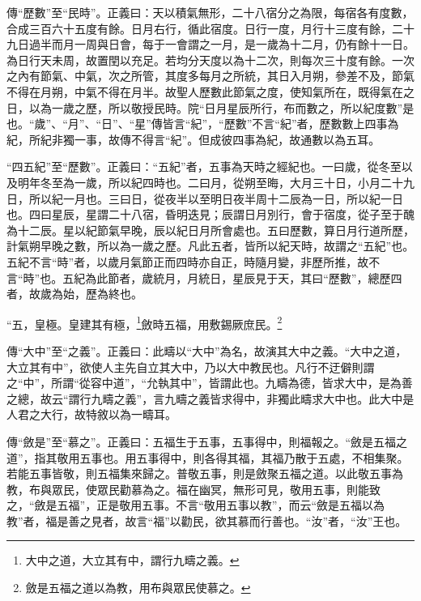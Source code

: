 {\noindent\zhuan{}\fzbyks 傳“歷數”至“民時”。正義曰：天以積氣無形，二十八宿分之為限，每宿各有度數，合成三百六十五度有餘。日月右行，循此宿度。日行一度，月行十三度有餘，二十九日過半而月一周與日會，每于一會謂之一月，是一歲為十二月，仍有餘十一日。為日行天未周，故置閏以充足。若均分天度以為十二次，則每次三十度有餘。一次之內有節氣、中氣，次之所管，其度多每月之所統，其日入月朔，參差不及，節氣不得在月朔，中氣不得在月半。故聖人歷數此節氣之度，使知氣所在，既得氣在之日，以為一歲之歷，所以敬授民時。院“日月星辰所行，布而數之，所以紀度數”是也。“歲”、“月”、“日”、“星”傳皆言“紀”，“歷數”不言“紀”者，歷數數上四事為紀，所紀非獨一事，故傳不得言“紀”。但成彼四事為紀，故通數以為五耳。 \par}

{\noindent\shu{}\fzkt “四五紀”至“歷數”。正義曰：“五紀”者，五事為天時之經紀也。一曰歲，從冬至以及明年冬至為一歲，所以紀四時也。二曰月，從朔至晦，大月三十日，小月二十九日，所以紀一月也。三曰日，從夜半以至明日夜半周十二辰為一日，所以紀一日也。四曰星辰，星謂二十八宿，昏明迭見；辰謂日月別行，會于宿度，從子至于醜為十二辰。星以紀節氣早晚，辰以紀日月所會處也。五曰歷數，算日月行道所歷，計氣朔早晚之數，所以為一歲之歷。凡此五者，皆所以紀天時，故謂之“五紀”也。五紀不言“時”者，以歲月氣節正而四時亦自正，時隨月變，非歷所推，故不言“時”也。五紀為此節者，歲統月，月統日，星辰見于天，其曰“歷數”，總歷四者，故歲為始，歷為終也。 \par}

“五，皇極。皇建其有極，\footnote{大中之道，大立其有中，謂行九疇之義。}斂時五福，用敷錫厥庶民。\footnote{斂是五福之道以為教，用布與眾民使慕之。}


{\noindent\zhuan{}\fzbyks 傳“大中”至“之義”。正義曰：此疇以“大中”為名，故演其大中之義。“大中之道，大立其有中”，欲使人主先自立其大中，乃以大中教民也。凡行不迂僻則謂之“中”，所謂“從容中道”，“允執其中”，皆謂此也。九疇為德，皆求大中，是為善之總，故云“謂行九疇之義”，言九疇之義皆求得中，非獨此疇求大中也。此大中是人君之大行，故特敘以為一疇耳。 \par}

{\noindent\zhuan{}\fzbyks 傳“斂是”至“慕之”。正義曰：五福生于五事，五事得中，則福報之。“斂是五福之道”，指其敬用五事也。用五事得中，則各得其福，其福乃散于五處，不相集聚。若能五事皆敬，則五福集來歸之。普敬五事，則是斂聚五福之道。以此敬五事為教，布與眾民，使眾民勸慕為之。福在幽冥，無形可見，敬用五事，則能致之，“斂是五福”，正是敬用五事。不言“敬用五事以教”，而云“斂是五福以為教”者，福是善之見者，故言“福”以勸民，欲其慕而行善也。“汝”者，“汝”王也。 \par}

